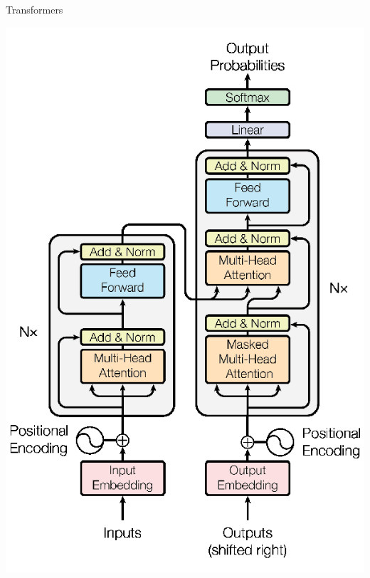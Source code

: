 \documentclass{beamer}
\begin{document}
\begin{frame}[fragile]{Transformers}
    \begin{center}
        \includegraphics[width=\textwidth,height=0.8\textheight,keepaspectratio]{figures/Transformer-Model.png}
    \end{center}
\end{frame}
\end{document}
